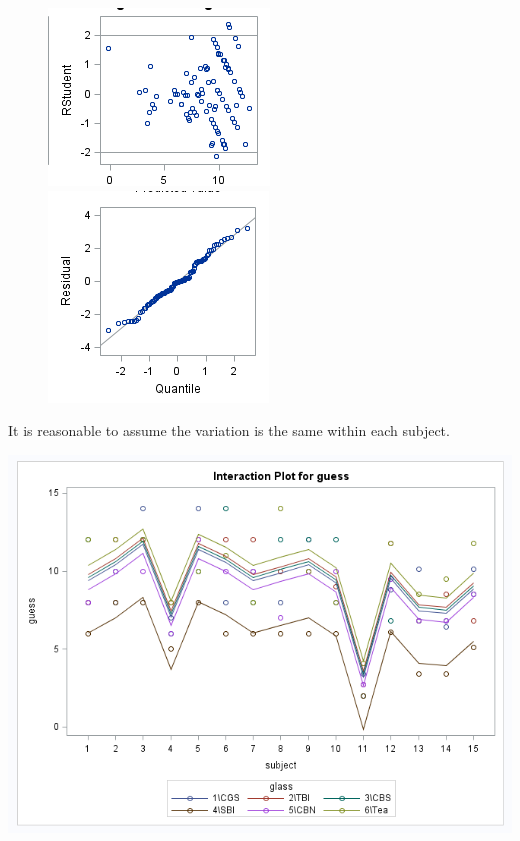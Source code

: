 \documentclass{article}\usepackage[]{graphicx}\usepackage[]{color}
\begin{document}
\begin{enumerate}
\begin{enumerate}
\begin{figure}
\centering
\begin{minipage}{.5\textwidth}
  \centering
  \includegraphics[width=.6\linewidth]{glasshov}
  \end{minipage}%
\begin{minipage}{.5\textwidth}
  \centering
  \includegraphics[width=.6\linewidth]{glassnorm}
\end{minipage}
\end{figure}

It is reasonable to assume the variation is the same within each subject.

\includegraphics[scale=0.75]{level2}


\end{enumerate}
\end{enumerate}
\end{document}
